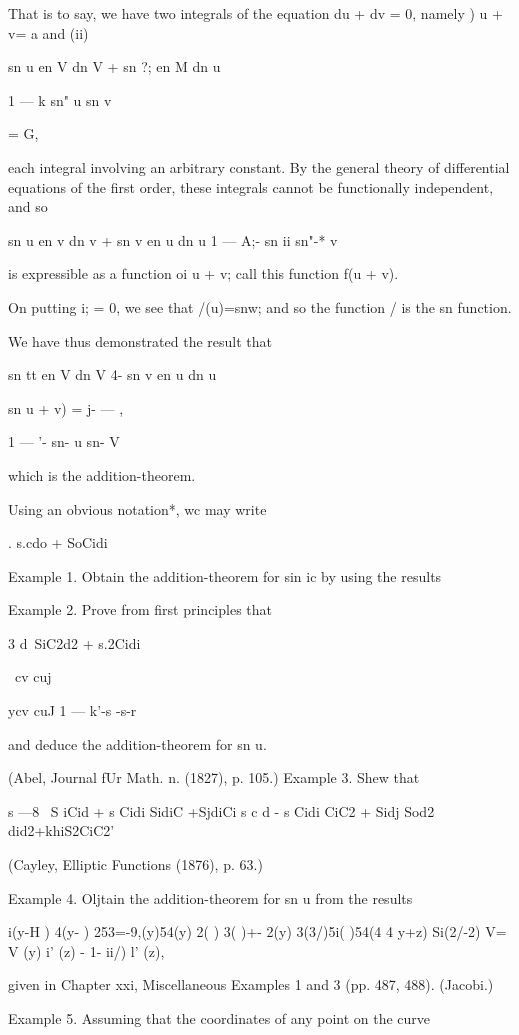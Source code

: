 That is to say, we have two integrals of the equation du + dv = 0,
namely ) u + v= a and (ii)

sn u en V dn V + sn ?; en M dn u

1 — k sn" u sn v

= G,

each integral involving an arbitrary constant. By the general theory
of differential equations of the first order, these integrals cannot
be functionally independent, and so

sn u en v dn v + sn v en u dn u 1 — A;- sn ii sn"-* v

is expressible as a function oi u + v; call this function f(u + v).

On putting i; = 0, we see that /(u)=snw; and so the function / is the
sn function.

We have thus demonstrated the result that

sn tt en V dn V 4- sn v en u dn u

sn u + v) = j- — ,

1 — '- sn- u sn- V

which is the addition-theorem.

Using an obvious notation*, wc may write

. s.cdo + SoCidi

Example 1. Obtain the addition-theorem for sin ic by using the results

Example 2. Prove from first principles that

3 d\ SiC2d2 + s.2Cidi\

\ cv cuj

ycv cuJ 1 — k'-s -s-r

and deduce the addition-theorem for sn u.

(Abel, Journal fUr Math. n. (1827), p. 105.) Example 3. Shew that

s —8 \ S iCid + s Cidi SidiC +SjdiCi s c d - s Cidi CiC2 + Sidj Sod2
did2+khiS2CiC2'

(Cayley, Elliptic Functions (1876), p. 63.)

Example 4. Oljtain the addition-theorem for sn u from the results

 i(y-H ) 4(y- ) 253=-9,(y)54(y) 2( ) 3( )+- 2(y) 3(3/)5i( )54(4 4 y+z)
Si(2/-2) V= V (y) i' (z) - 1- ii/) l' (z),

given in Chapter xxi, Miscellaneous Examples 1 and 3 (pp. 487, 488).
(Jacobi.)

Example 5. Assuming that the coordinates of any point on the curve

